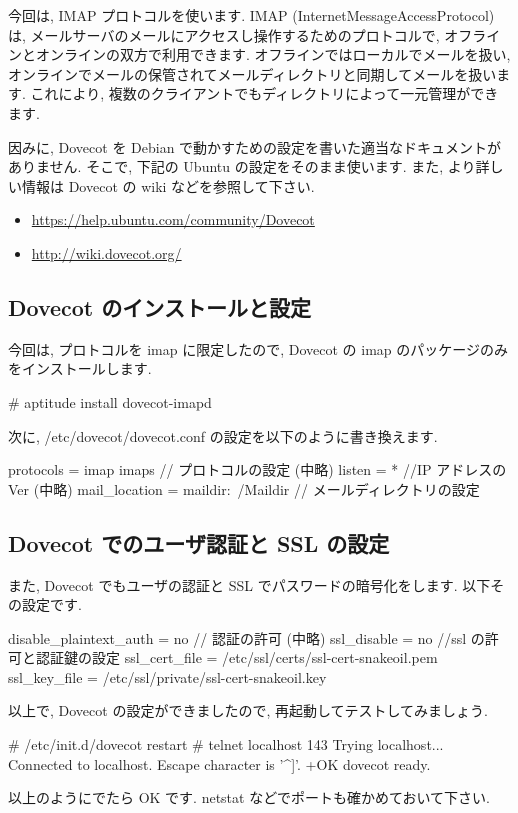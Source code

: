\documentclass[mingoth,a4paper]{jsarticle}
\begin{document}
今回は, IMAP プロトコルを使います. IMAP (InternetMessageAccessProtocol) は, メールサーバのメールにアクセスし操作するためのプロトコルで, オフラインとオンラインの双方で利用できます. オフラインではローカルでメールを扱い, オンラインでメールの保管されてメールディレクトリと同期してメールを扱います. これにより, 複数のクライアントでもディレクトリによって一元管理ができます.

因みに, Dovecot を Debian で動かすための設定を書いた適当なドキュメントがありません. そこで, 下記の Ubuntu の設定をそのまま使います. また, より詳しい情報は Dovecot の wiki などを参照して下さい.
\begin{itemize}
\item \url{https://help.ubuntu.com/community/Dovecot}
\end{itemize}
\begin{itemize}
\item \url{http://wiki.dovecot.org/}
\end{itemize}

\subsection{Dovecot のインストールと設定}
今回は, プロトコルを imap に限定したので, Dovecot の imap のパッケージのみをインストールします.
\begin{commandline}
# aptitude install dovecot-imapd
\end{commandline}

次に, /etc/dovecot/dovecot.conf の設定を以下のように書き換えます.
\begin{commandline}
protocols = imap imaps            // プロトコルの設定
    (中略)
listen = *                        //IP アドレスの Ver
    (中略)
mail_location = maildir:~/Maildir // メールディレクトリの設定
\end{commandline}

\subsection{Dovecot でのユーザ認証と SSL の設定}
また, Dovecot でもユーザの認証と SSL でパスワードの暗号化をします. 以下その設定です.
\begin{commandline}
disable_plaintext_auth = no // 認証の許可
    (中略)
ssl_disable = no  //ssl の許可と認証鍵の設定
ssl_cert_file = /etc/ssl/certs/ssl-cert-snakeoil.pem
ssl_key_file = /etc/ssl/private/ssl-cert-snakeoil.key
\end{commandline}

以上で, Dovecot の設定ができましたので, 再起動してテストしてみましょう.
\begin{commandline}
# /etc/init.d/dovecot restart
# telnet localhost 143
  Trying localhost...
  Connected to localhost.
  Escape character is '^]'.
  +OK dovecot ready.
\end{commandline}
以上のようにでたら OK です. netstat などでポートも確かめておいて下さい.
\end{document}
